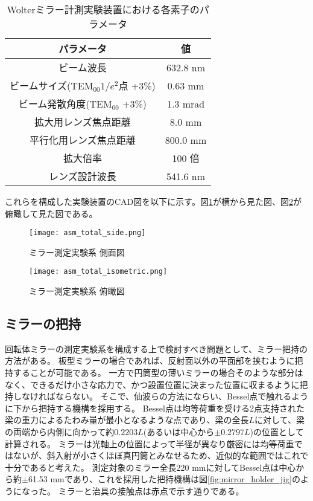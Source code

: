 \begin{table}[h]
\begin{center}
  \caption{Wolterミラー計測実験装置における各素子のパラメータ}
  \begin{tabular}{|c|c|} \hline
    パラメータ & 値 \\ \hline
    ビーム波長 & 632.8 nm  \\
    ビームサイズ($\text{TEM}_{00} 1/e^2$点 +3\%) & 0.63 mm  \\
    ビーム発散角度($\text{TEM}_{00}$ +3\%) & 1.3 mrad  \\
    拡大用レンズ焦点距離 & 8.0 mm  \\
    平行化用レンズ焦点距離 & 800.0 mm  \\
    拡大倍率 & 100 倍 \\
    レンズ設計波長 & 541.6 nm \\ \hline
  \end{tabular}
  \label{tb:mirror_experiment_params}
\end{center}
\end{table}

これらを構成した実験装置のCAD図を以下に示す。図\ref{fig:mirror_experiment_asm_cad_side}が横から見た図、図\ref{fig:mirror_experiment_asm_cad_isometric}が俯瞰して見た図である。

\begin{figure}[!ht]
\centering
\texttt{[image: asm\_total\_side.png]}
\caption{ミラー測定実験系 側面図}
\label{fig:mirror_experiment_asm_cad_side}
\end{figure}

\begin{figure}[!ht]
\centering
\texttt{[image: asm\_total\_isometric.png]}
\caption{ミラー測定実験系 俯瞰図}
\label{fig:mirror_experiment_asm_cad_isometric}
\end{figure}


\subsection{ミラーの把持}
回転体ミラーの測定実験系を構成する上で検討すべき問題として、ミラー把持の方法がある。
板型ミラーの場合であれば、反射面以外の平面部を挟むように把持することが可能である。
一方で円筒型の薄いミラーの場合そのような部分はなく、できるだけ小さな応力で、かつ設置位置に決まった位置に収まるように把持しなければならない。
そこで、仙波らの方法にならい、Bessel点で触れるように下から把持する機構を採用する。\cite{Senba2010}
Bessel点は均等荷重を受ける2点支持された梁の重力によるたわみ量が最小となるような点であり、梁の全長$L$に対して、梁の両端から内側に向かって約$0.2203L$(あるいは中心から$\pm 0.2797 L$)の位置として計算される。
ミラーは光軸上の位置によって半径が異なり厳密には均等荷重ではないが、斜入射が小さくほぼ真円筒とみなせるため、近似的な範囲ではこれで十分であると考えた。
測定対象のミラー全長220 mmに対してBessel点は中心から約$\pm$61.53 mmであり、これを採用した把持機構は図\ref{fig:mirror_holder_jig}のようになった。
ミラーと治具の接触点は赤点で示す通りである。

